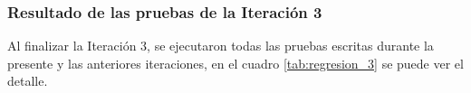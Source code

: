 \subsubsection{Resultado de las pruebas de la Iteración 3}

Al finalizar la Iteración 3, se ejecutaron todas las pruebas escritas durante la presente y las anteriores iteraciones, en el cuadro \ref{tab:regresion_3} se puede ver el detalle.


%
%
%
%
%
%
%
%
%
%
%
%
%
%
%
